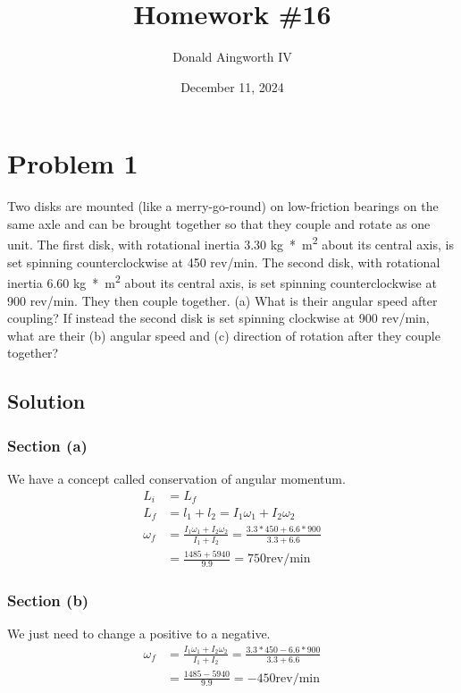 \documentclass[12pt]{article}
\title{Homework \#16}
\author{Donald Aingworth IV}
\date{December 11, 2024}
\begin{document}

\maketitle

\pagebreak
\section{Problem 1}
Two disks are mounted (like a merry-go-round) on low-friction bearings on the same axle and can be brought together so that they couple and rotate as one unit. The first disk, with rotational inertia 3.30 \unit{\kilo\gram*\meter^2} about its central axis, is set spinning counterclockwise at 450 rev/min. The second disk, with rotational inertia 6.60 \unit{\kilo\gram*\meter^2} about its central axis, is set spinning counterclockwise at 900 rev/min. They then couple together. (a) What is their angular speed after coupling? If instead the second disk is set spinning clockwise at 900 rev/min, what are their (b) angular speed and (c) direction of rotation after they couple together?

\subsection{Solution}
\subsubsection{Section (a)}
We have a concept called conservation of angular momentum. 
\begin{align}
    L_i &=  L_f\\
    L_f &=  l_1 + l_2
        =   I_1\omega_1 + I_2\omega_2\\
    \omega_f    &=  \frac{I_1\omega_1 + I_2\omega_2}{I_1 + I_2}
        =   \frac{3.3*450 + 6.6*900}{3.3 + 6.6}\\
        &=  \frac{1485 + 5940}{9.9}
        =   \boxed{750\text{rev/min}}
\end{align}

\subsubsection{Section (b)}
We just need to change a positive to a negative. 
\begin{align}
    \omega_f    &=  \frac{I_1\omega_1 + I_2\omega_2}{I_1 + I_2}
        =   \frac{3.3*450 - 6.6*900}{3.3 + 6.6}\\
        &=  \frac{1485 - 5940}{9.9}
        =   \boxed{-450\text{rev/min}}
\end{align}
\end{document}

